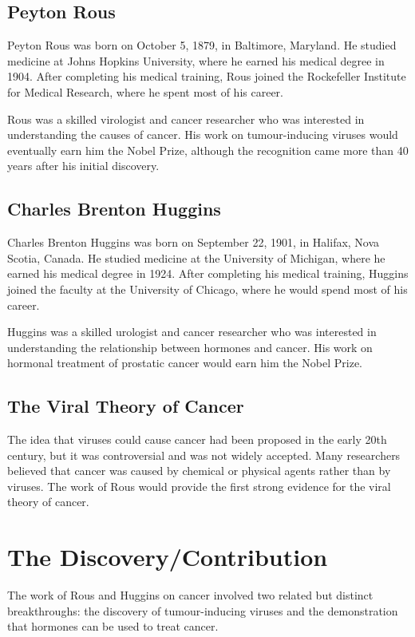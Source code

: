 \subsection{Peyton Rous}

Peyton Rous was born on October 5, 1879, in Baltimore, Maryland. He studied medicine at Johns Hopkins University, where he earned his medical degree in 1904. After completing his medical training, Rous joined the Rockefeller Institute for Medical Research, where he spent most of his career.

Rous was a skilled virologist and cancer researcher who was interested in understanding the causes of cancer. His work on tumour-inducing viruses would eventually earn him the Nobel Prize, although the recognition came more than 40 years after his initial discovery.

\subsection{Charles Brenton Huggins}

Charles Brenton Huggins was born on September 22, 1901, in Halifax, Nova Scotia, Canada. He studied medicine at the University of Michigan, where he earned his medical degree in 1924. After completing his medical training, Huggins joined the faculty at the University of Chicago, where he would spend most of his career.

Huggins was a skilled urologist and cancer researcher who was interested in understanding the relationship between hormones and cancer. His work on hormonal treatment of prostatic cancer would earn him the Nobel Prize.

\subsection{The Viral Theory of Cancer}

The idea that viruses could cause cancer had been proposed in the early 20th century, but it was controversial and was not widely accepted. Many researchers believed that cancer was caused by chemical or physical agents rather than by viruses. The work of Rous would provide the first strong evidence for the viral theory of cancer.

\section{The Discovery/Contribution}

The work of Rous and Huggins on cancer involved two related but distinct breakthroughs: the discovery of tumour-inducing viruses and the demonstration that hormones can be used to treat cancer.

